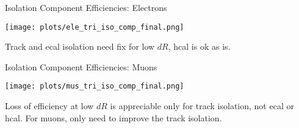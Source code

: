 \documentclass{beamer}
\begin{document}
\begin{frame}{Isolation Component Efficiencies: Electrons}
  \begin{center}
    
\texttt{[image: plots/ele\_tri\_iso\_comp\_final.png]}

    Track and ecal isolation need fix for low $dR$, hcal is ok as is.
  \end{center}
\end{frame}

\begin{frame}{Isolation Component Efficiencies: Muons}%
    
  \begin{center}
    \vspace{-0.2cm}
    \texttt{[image: plots/mus\_tri\_iso\_comp\_final.png]}
    
    

    
  Loss of efficiency at low $dR$ is appreciable only for track isolation, not ecal or hcal. For muons, only need to improve the track isolation.
  \end{center}
\end{frame}
\end{document}
